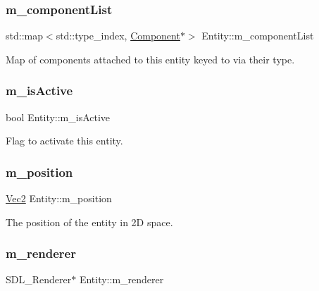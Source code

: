 \subsubsection{\texorpdfstring{m\+\_\+component\+List}{m\_componentList}}
{\footnotesize\ttfamily std\+::map$<$std\+::type\+\_\+index, \mbox{\hyperlink{class_component}{Component}}$\ast$$>$ Entity\+::m\+\_\+component\+List\hspace{0.3cm}{\ttfamily [protected]}}

Map of components attached to this entity keyed to via their type. \mbox{\label{class_entity_a1e67bc72cc50f2be6903cfa23b25f3df}} 
\subsubsection{\texorpdfstring{m\+\_\+is\+Active}{m\_isActive}}
{\footnotesize\ttfamily bool Entity\+::m\+\_\+is\+Active\hspace{0.3cm}{\ttfamily [protected]}}

Flag to activate this entity. \mbox{\label{class_entity_af1dc457432910811ea84e53dc1aedffc}} 
\subsubsection{\texorpdfstring{m\+\_\+position}{m\_position}}
{\footnotesize\ttfamily \mbox{\hyperlink{struct_vec2}{Vec2}} Entity\+::m\+\_\+position\hspace{0.3cm}{\ttfamily [protected]}}

The position of the entity in 2D space. \mbox{\label{class_entity_a797ca76b3015996cbeb3225eff168cfa}} 
\subsubsection{\texorpdfstring{m\+\_\+renderer}{m\_renderer}}
{\footnotesize\ttfamily S\+D\+L\+\_\+\+Renderer$\ast$ Entity\+::m\+\_\+renderer\hspace{0.3cm}{\ttfamily [protected]}}


